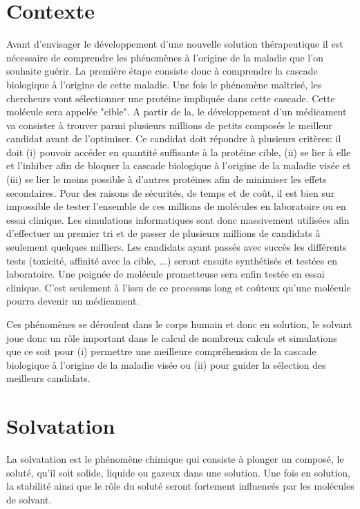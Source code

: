 \section{Contexte}
Avant d'envisager le développement d'une nouvelle solution thérapeutique il est nécessaire de comprendre les phénomènes à l'origine de la maladie que l'on souhaite guérir. La première étape consiste donc à comprendre la cascade biologique à l'origine de cette maladie. Une fois le phénomène maîtrisé, les chercheurs vont sélectionner une protéine impliquée dans cette cascade. Cette molécule sera appelée "cible". A partir de la, le développement d'un médicament va consister à trouver  parmi plusieurs millions de petits composés le meilleur candidat avant de l'optimiser. Ce candidat doit répondre à plusieurs critères: il doit (i) pouvoir accéder en quantité suffisante à la protéine cible, (ii) se lier à elle et l'inhiber afin de bloquer la cascade biologique à l'origine de la maladie visée et (iii) se lier le moins possible à d'autres protéines afin de minimiser les effets secondaires. Pour des raisons de sécurités, de temps et de coût, il est bien sur impossible de tester l'ensemble de ces millions de molécules en laboratoire ou en essai clinique. Les simulations informatiques sont donc massivement utilisées afin d'effectuer un premier tri et de passer de plusieurs millions de candidats à seulement quelques milliers. Les candidats ayant passés avec succès les différents tests (toxicité, affinité avec la cible, ...) seront ensuite synthétisés et testées en laboratoire. Une poignée de molécule prometteuse sera enfin testée en essai clinique. C'est seulement à l'issu de ce processus long et coûteux qu'une molécule pourra devenir un médicament.


Ces phénomènes se déroulent dans le corps humain et donc en solution, le solvant joue donc un rôle important dans le calcul de nombreux calculs et simulations que ce soit pour (i) permettre une meilleure compréhension de la cascade biologique à l'origine de la maladie visée ou (ii) pour guider la sélection des meilleurs candidats. 



\section{Solvatation}
La solvatation est le phénomène chimique qui consiste à plonger un composé, le soluté, qu'il soit solide, liquide ou gazeux dans une solution. Une fois en solution, la stabilité ainsi que le rôle du soluté seront fortement influencés par les molécules de solvant\cite{NickPace_protein_2004,levy_water_2004,Meyer_internal_1992,Ladbury_just_1996}. 


